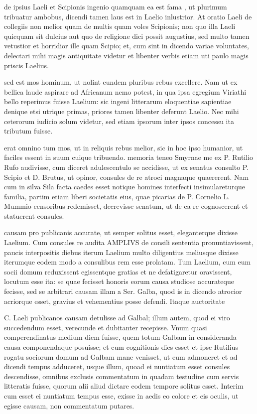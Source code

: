  de ipsius Laeli et Scipionis ingenio quamquam ea est fama , ut plurimum tribuatur ambobus, dicendi tamen laus est in Laelio inlustrior. At oratio Laeli de collegiis non melior quam de multis quam voles Scipionis; non quo illa Laeli quicquam sit dulcius aut quo de religione dici possit augustius, sed multo tamen vetustior et horridior ille quam Scipio; et, cum sint in dicendo variae voluntates, delectari mihi magis antiquitate videtur et libenter verbis etiam uti paulo magis priscis Laelius.

 sed est mos hominum, ut nolint eundem pluribus rebus excellere. Nam ut ex bellica laude aspirare ad Africanum nemo potest, in qua ipsa egregium Viriathi bello reperimus fuisse Laelium: sic ingeni litterarum eloquentiae sapientiae denique etsi utrique primas, priores tamen libenter deferunt Laelio. Nec mihi ceterorum iudicio solum videtur, sed etiam ipsorum inter ipsos concessu ita tributum fuisse.

 erat omnino tum mos, ut in reliquis rebus melior, sic in hoc ipso humanior, ut faciles essent in suum cuique tribuendo. memoria teneo Smyrnae me ex P. Rutilio Rufo audivisse, cum diceret adulescentulo se accidisse, ut ex senatus consulto P. Scipio et D. Brutus, ut opinor, consules de re atroci magnaque quaererent. Nam cum in silva Sila facta caedes esset notique homines interfecti insimulareturque familia, partim etiam liberi societatis eius, quae picarias de P. Cornelio L. Mummio censoribus redemisset, decrevisse senatum, ut de ea re cognoscerent et statuerent consules.

 causam pro publicanis accurate, ut semper solitus esset, eleganterque dixisse Laelium. Cum consules re audita AMPLIVS de consili sententia pronuntiavissent, paucis interpositis diebus iterum Laelium multo diligentius meliusque dixisse iterumque eodem modo a consulibus rem esse prolatam. Tum Laelium, cum eum socii domum reduxissent egissentque gratias et ne defatigaretur oravissent, locutum esse ita: se quae fecisset honoris eorum causa studiose accurateque fecisse, sed se arbitrari causam illam a Ser. Galba, quod is in dicendo atrocior acriorque esset, gravius et vehementius posse defendi. Itaque auctoritate

 C. Laeli publicanos causam detulisse ad Galbal; illum autem, quod ei viro succedendum esset, verecunde et dubitanter recepisse. Vnum quasi comperendinatus medium diem fuisse, quem totum Galbam in consideranda causa componendaque posuisse; et cum cognitionis dies esset et ipse Rutilius rogatu sociorum domum ad Galbam mane venisset, ut eum admoneret et ad dicendi tempus adduceret, usque illum, quoad ei nuntiatum esset consules descendisse, omnibus exclusis commentatum in quadam testudine cum servis litteratis fuisse, quorum alii aliud dictare eodem tempore solitus esset. Interim cum esset ei nuntiatum tempus esse, exisse in aedis eo colore et eis oculis, ut egisse causam, non commentatum putares.

